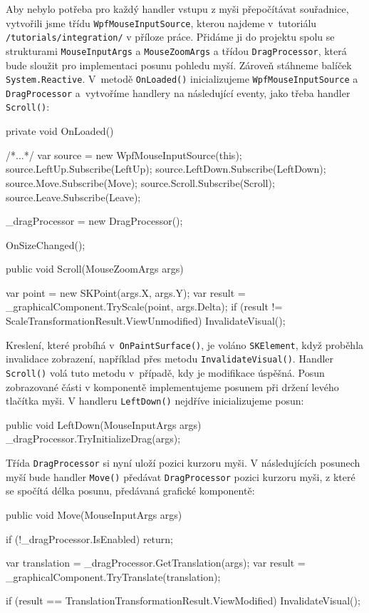 Aby nebylo potřeba pro každý handler vstupu z myši přepočítávat souřadnice, vytvořili jsme třídu \texttt{WpfMouseInputSource}, kterou najdeme v~tutoriálu \texttt{/tutorials/integration/} v příloze práce. Přidáme ji do projektu spolu se strukturami \texttt{MouseInputArgs} a \texttt{MouseZoomArgs} a třídou \texttt{DragProcessor}, která bude sloužit pro implementaci posunu pohledu myší. Zároveň stáhneme balíček \texttt{System.Reactive}. V~metodě \texttt{OnLoaded()} inicializujeme \texttt{WpfMouseInputSource} a \texttt{DragProcessor} a~vytvoříme handlery na následující eventy, jako třeba handler \texttt{Scroll()}:

\begin{csharpcode}
private void OnLoaded() {
 
  /*...*/
  var source = new WpfMouseInputSource(this);
  source.LeftUp.Subscribe(LeftUp);
  source.LeftDown.Subscribe(LeftDown);
  source.Move.Subscribe(Move);
  source.Scroll.Subscribe(Scroll);
  source.Leave.Subscribe(Leave);
  
  _dragProcessor = new DragProcessor();

  OnSizeChanged();
}

public void Scroll(MouseZoomArgs args) {

	var point = new SKPoint(args.X, args.Y);
	var result = _graphicalComponent.TryScale(point, args.Delta);
	if (result != ScaleTransformationResult.ViewUnmodified) {
		InvalidateVisual();
	}
}
\end{csharpcode}

Kreslení, které probíhá v~\texttt{OnPaintSurface()}, je voláno \texttt{SKElement}, když proběhla invalidace zobrazení, například přes metodu \texttt{InvalidateVisual()}. Handler \linebreak\texttt{Scroll()} volá tuto metodu v~případě, kdy je modifikace úspěšná. Posun zobrazované části v komponentě implementujeme posunem při držení levého tlačítka myši. V handleru \texttt{LeftDown()} nejdříve inicializujeme posun:
\begin{csharpcode}
public void LeftDown(MouseInputArgs args) {
	_dragProcessor.TryInitializeDrag(args);
}
\end{csharpcode}

Třída \texttt{DragProcessor} si nyní uloží pozici kurzoru myši. V následujících posunech myší bude handler \texttt{Move()} předávat \texttt{DragProcessor} pozici kurzoru myši, z které se spočítá délka posunu, předávaná grafické komponentě:

\begin{csharpcode}
public void Move(MouseInputArgs args) {

  if (!_dragProcessor.IsEnabled) {
	return;
  }

  var translation = _dragProcessor.GetTranslation(args);
  var result = _graphicalComponent.TryTranslate(translation);

  if (result == TranslationTransformationResult.ViewModified) {
    InvalidateVisual();
  }
}		
\end{csharpcode}

